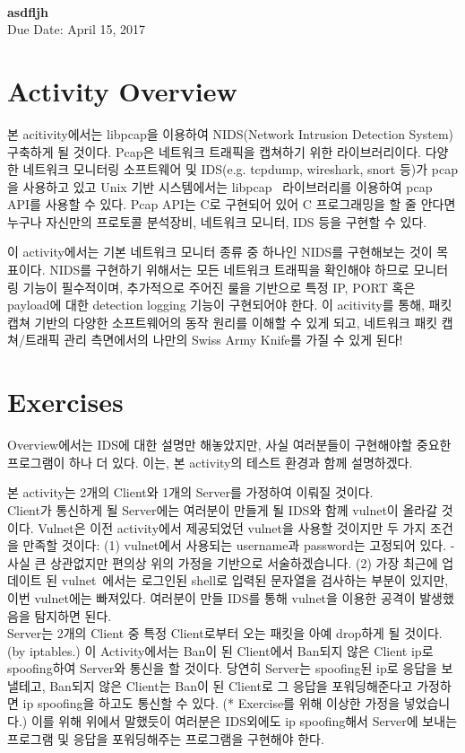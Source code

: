 \documentclass[a4paper, 11pt]{article}
\theoremstyle{definition}
\begin{document}
 \\
         {\phantom{} \hfill \textbf{asdfljh}} \\
         {\phantom{} \hfill Due Date: April 15, 2017} \\

\section{Activity Overview}

본 acitivity에서는 libpcap을 이용하여 NIDS(Network Intrusion Detection System) 구축하게 될 것이다. Pcap은 네트워크 트래픽을 캡쳐하기 위한 라이브러리이다. 다양한 네트워크 모니터링 소프트웨어 및 
IDS(e.g. tcpdump, wireshark, snort 등)가 pcap을 사용하고 있고 Unix 기반 시스템에서는 libpcap~\cite{libpcap} 라이브러리를 이용하여 pcap API를 사용할 수 있다. Pcap API는 C로 구현되어 있어 C 프로그래밍을 할 줄 안다면 누구나 자신만의 프로토콜 분석장비, 네트워크 모니터, IDS 등을 구현할 수 있다.

이 activity에서는 기본 네트워크 모니터 종류 중 하나인 NIDS를 구현해보는 것이 목표이다. NIDS를 구현하기 위해서는 모든 네트워크 트래픽을 확인해야 하므로 모니터링 기능이 필수적이며, 추가적으로 주어진 룰을 기반으로 특정 IP, PORT 혹은 payload에 대한 detection logging 기능이 구현되어야 한다. 이 acitivity를 통해, 패킷 캡쳐 기반의 다양한 소프트웨어의 동작 원리를 이해할 수 있게 되고, 네트워크 패킷 캡쳐/트래픽 관리 측면에서의 나만의 Swiss Army Knife를 가질 수 있게 된다!

\section{Exercises}

Overview에서는 IDS에 대한 설명만 해놓았지만, 사실 여러분들이 구현해야할 중요한 프로그램이 하나 더 있다. 이는, 본 activity의 테스트 환경과 함께 설명하겠다.

본 activity는 2개의 Client와 1개의 Server를 가정하여 이뤄질 것이다.
\\Client가 통신하게 될 Server에는 여러분이 만들게 될 IDS와 함께 vulnet이 올라갈 것이다. Vulnet은 이전 activity에서 제공되었던 vulnet을 사용할 것이지만 두 가지 조건을 만족할 것이다: (1) vulnet에서 사용되는 username과 password는 고정되어 있다. - 사실 큰 상관없지만 편의상 위의 가정을 기반으로 서술하겠습니다. (2) 가장 최근에 업데이트 된 vulnet~\cite{updatedvulnet}에서는 로그인된 shell로 입력된 문자열을 검사하는 부분이 있지만, 이번 vulnet에는 빠져있다. 여러분이 만들 IDS를 통해 vulnet을 이용한 공격이 발생했음을 탐지하면 된다.
\\Server는 2개의 Client 중 특정 Client로부터 오는 패킷을 아예 drop하게 될 것이다.(by iptables.) 이 Activity에서는 Ban이 된 Client에서 Ban되지 않은 Client ip로 spoofing하여 Server와 통신을 할 것이다. 당연히 Server는 spoofing된 ip로 응답을 보낼테고, Ban되지 않은 Client는 Ban이 된 Client로 그 응답을 포워딩해준다고 가정하면 ip spoofing을 하고도 통신할 수 있다. (* Exercise를 위해 이상한 가정을 넣었습니다.) 이를 위해 위에서 말했듯이 여러분은 IDS외에도 ip spoofing해서 Server에 보내는 프로그램 및 응답을 포워딩해주는 프로그램을 구현해야 한다.
\end{document}

